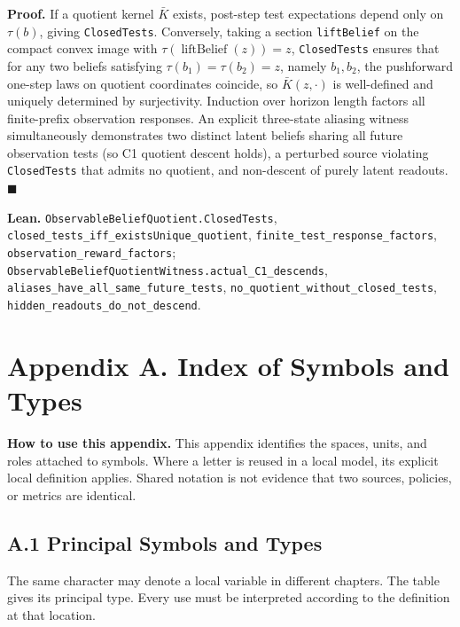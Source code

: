 \documentclass[
  english,
  11pt,
  oneside]{book}
\begin{document}
\textbf{Proof.} If a quotient kernel \(\bar K\) exists, post-step test expectations depend only on \(\tau(b)\), giving \texttt{ClosedTests}. Conversely, taking a section \texttt{liftBelief} on the compact convex image with \(\tau(\operatorname{liftBelief}(z))=z\), \texttt{ClosedTests} ensures that for any two beliefs satisfying \(\tau(b_1)=\tau(b_2)=z\), namely \(b_1,b_2\), the pushforward one-step laws on quotient coordinates coincide, so \(\bar K(z,\cdot)\) is well-defined and uniquely determined by surjectivity. Induction over horizon length factors all finite-prefix observation responses. An explicit three-state aliasing witness simultaneously demonstrates two distinct latent beliefs sharing all future observation tests (so C1 quotient descent holds), a perturbed source violating \texttt{ClosedTests} that admits no quotient, and non-descent of purely latent readouts. \(\blacksquare\)

\textbf{Lean.} \nolinkurl{ObservableBeliefQuotient.ClosedTests}, \nolinkurl{closed_tests_iff_existsUnique_quotient}, \nolinkurl{finite_test_response_factors}, \nolinkurl{observation_reward_factors}; \nolinkurl{ObservableBeliefQuotientWitness.actual_C1_descends}, \nolinkurl{aliases_have_all_same_future_tests}, \nolinkurl{no_quotient_without_closed_tests}, \nolinkurl{hidden_readouts_do_not_descend}.

\chapter{Appendix A. Index of Symbols and Types}\label{appendix-a}

\textbf{How to use this appendix.} This appendix identifies the spaces, units, and roles attached to symbols. Where a letter is reused in a local model, its explicit local definition applies. Shared notation is not evidence that two sources, policies, or metrics are identical.

\section{A.1 Principal Symbols and Types}\label{a.1-principal-symbols-and-types}

The same character may denote a local variable in different chapters. The table gives its principal type. Every use must be interpreted according to the definition at that location.
\end{document}
